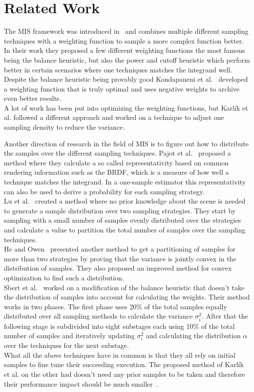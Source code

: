 \chapter{Related Work}
\label{ch:related_work}

The MIS framework was introduced in~\cite{veach_guibas}
and combines multiple different sampling techniques with a weighting function to sample a more complex function better.
In their work they proposed a few different weighting functions the most famous being the balance heuristic,
but also the power and cutoff heuristic which perform better in certain scenarios where one techniques matches the integrand well.
Despite the balance heuristic being provably good Kondapaneni et al.~\cite{Kondapaneni2019} developed a weighting function that is truly optimal
and uses negative weights to archive even better results.\\
A lot of work has been put into optimizing the weighting functions,
but Karl\'ik et al. followed a different approach
and worked on a technique to adjust one sampling density to reduce the variance.

Another direction of research in the field of MIS is to figure out how to distribute the samples over the different sampling techniques.
Pajot et al.~\cite{pajot} proposed a method where they calculate a so called representativity based on common rendering information such as the BRDF,
which is a measure of how well a technique matches the integrand.
In a one-sample estimator this representativity can also be used to derive a probability for each sampling strategy.\\
Lu et al.~\cite{lu} created a method where no prior knowledge about the scene is needed to generate a sample distribution over two sampling strategies.
They start by sampling with a small number of samples evenly distributed over the strategies
and calculate a value to partition the total number of samples over the sampling techniques.\\
He and Owen~\cite{he} presented another method to get a partitioning of samples for more than two strategies
by proving that the variance is jointly convex in the distribution of samples.
They also proposed an improved method for convex optimization to find such a distribution.\\
Sbert et al.~\cite{sbert} worked on a modification of the balance heuristic that doesn't take the distribution of samples into account for calculating the weights.
Their method works in two phases.
The first phase uses 20\% of the total samples equally distributed over all sampling methods to calculate the variance $ \sigma^2_i $.
After that the following stage is subdivided into eight substages each using 10\% of the total number of samples
and iteratively updating $ \sigma^2_i $ and calculating the distribution $ \alpha $ over the techniques for the next substage.\\
What all the above techniques have in common is that they all rely on initial samples to fine tune their succeeding execution.
The proposed method of Karl\'ik et al. on the other had doesn't need any prior samples to be taken and therefore their performance impact should be much smaller~\cite{Karlik2019}.


